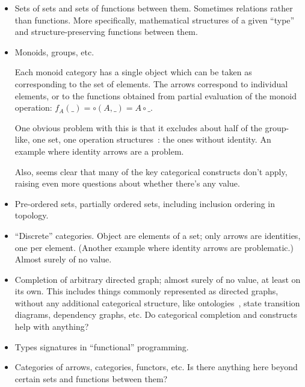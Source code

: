 \documentclass[11pt,openany]{article}
\begin{document}
\begin{itemize}
  \item Sets of sets and sets of functions between them.
Sometimes relations rather than functions.
More specifically, mathematical structures of a given ``type'' and
structure-preserving functions between them.

  \item Monoids, groups, etc. \par
  Each monoid category has a single object which can be taken as
  corresponding to the set of elements. The arrows correspond to 
  individual elements, or to the functions obtained from partial
  evaluation of the monoid operation: 
  $f_A(\_)= \circ (A,\_) = A \circ \_$.\par
  One obvious problem with this is that it excludes about half of
  the group-like, one set, one operation structures~\cite{wiki:Magma}: 
  the ones without identity. 
  An example where identity arrows are a problem. \par
  Also, seems clear that many of the key categorical constructs
  don't apply, raising even more questions about whether there's
  any value.
  
  \item Pre-ordered sets, partially ordered sets, including
  inclusion ordering in topology.
  
  
  \item ``Discrete'' categories. Object are elements of a set; 
  only arrows are identities, one per element. 
  (Another example where identity arrows are problematic.)
  Almost surely of no value.
  
  \item Completion of arbitrary directed graph; 
  almost surely of no value, at least on its own.
  This includes things commonly represented as directed graphs,
  without any additional categorical structure, like ontologies~\cite{spivakd:2013},
  state transition diagrams, dependency graphs, etc.
  Do categorical completion and constructs help with anything?
  
  \item Types signatures in ``functional'' programming.
  
  \item Categories of arrows, categories, functors, etc.
  Is there anything here beyond certain sets and functions between
  them?
  
\end{itemize}
\setcounter{currentlevel}{\value{baseSectionLevel}}
\label{sec:Bottom-up}
\end{document}
